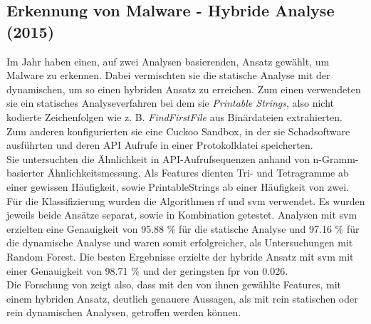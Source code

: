 \documentclass[
    12pt, %
    DIV10,
    ngerman, %
    a4paper, %
    oneside, %
    titlepage, %
    parskip=half, %
    headings=normal, %
    listof=totoc, %
    bibliography=totoc, %
    index=totoc, %
    captions=tableheading, %
    final %
]{scrreprt}
\begin{document}
\subsection{Erkennung von Malware - Hybride Analyse (2015)}
Im Jahr \citeyear{Shijo2015} haben \textcite{Shijo2015} einen, auf zwei Analysen basierenden, Ansatz gewählt, um Malware zu erkennen. Dabei vermischten sie die statische Analyse mit der dynamischen, um so einen hybriden Ansatz zu erreichen. Zum einen verwendeten sie ein statisches Analyseverfahren bei dem sie \emph{Printable Strings}, also nicht kodierte Zeichenfolgen wie z. B. \emph{FindFirstFile} aus Binärdateien extrahierten. Zum anderen konfigurierten sie eine Cuckoo Sandbox, in der sie Schadsoftware ausführten und deren API Aufrufe in einer Protokolldatei speicherten.\\
Sie untersuchten die Ähnlichkeit in API-Aufrufsequenzen anhand von n-Gramm-basierter Ähnlichkeitsmessung. 
Als Features dienten Tri- und Tetragramme ab einer gewissen Häufigkeit, sowie PrintableStrings ab einer Häufigkeit von zwei.
Für die Klassifizierung wurden die Algorithmen \ac{rf} und \ac{svm} verwendet.
Es wurden jeweils beide Ansätze separat, sowie in Kombination getestet. Analysen mit \ac{svm} erzielten eine Genauigkeit von 95.88 \% für die statische Analyse und 97.16 \% für die dynamische Analyse und waren somit erfolgreicher, als Untersuchungen mit Random Forest. Die besten Ergebnisse erzielte der hybride Ansatz mit \ac{svm} mit einer Genauigkeit von 98.71 \% und der geringsten \ac{fpr} von 0.026.\\
Die Forschung von \textcite{Shijo2015} zeigt also, dass mit den von ihnen gewählte Features, mit einem hybriden Ansatz, deutlich genauere Aussagen, als mit rein statischen oder rein dynamischen Analysen, getroffen werden können.

%
\end{document}
